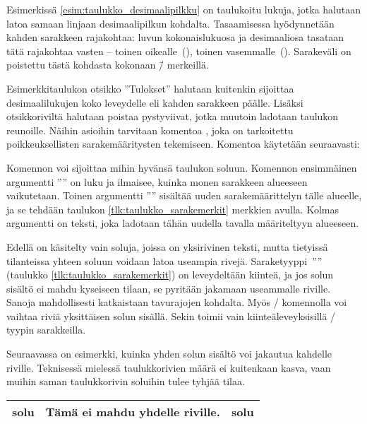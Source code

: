 Esimerkissä \ref{esim:taulukko_desimaalipilkku} on taulukoitu lukuja,
jotka halutaan latoa samaan linjaan desimaalipilkun kohdalta.
Tasaamisessa hyödynnetään kahden sarakkeen rajakohtaa: luvun
kokonaislukuosa ja desimaaliosa tasataan tätä rajakohtaa vasten --
toinen oikealle~(), toinen vasemmalle~(). Sarakeväli
on poistettu tästä kohdasta kokonaan \=/ merkeillä.

Esimerkkitaulukon otsikko ''Tulokset'' halutaan kuitenkin sijoittaa
desimaalilukujen koko leveydelle eli kahden sarakkeen päälle. Lisäksi
otsikkoriviltä halutaan poistaa pystyviivat, jotka muutoin ladotaan
taulukon reunoille. Näihin asioihin tarvitaan komentoa
, joka on tarkoitettu poikkeuksellisten
sarakemääritysten tekemiseen. Komentoa käytetään seuraavasti:

\begin{koodilohkosis}
\end{koodilohkosis}

Komennon  voi sijoittaa mihin hyvänsä taulukon
soluun. Komennon ensimmäinen argumentti '''' on luku ja
ilmaisee, kuinka monen sarakkeen alueeseen vaikutetaan. Toinen
argumentti '''' sisältää uuden sarakemäärittelyn
tälle alueelle, ja se tehdään taulukon \ref{tlk:taulukko_sarakemerkit}
merkkien avulla. Kolmas argumentti on teksti, joka ladotaan tähän
uudella tavalla määriteltyyn alueeseen.

Edellä on käsitelty vain soluja, joissa on yksirivinen teksti, mutta
tietyissä tilanteissa yhteen soluun voidaan latoa useampia rivejä.
Saraketyyppi~'''' (taulukko \ref{tlk:taulukko_sarakemerkit}) on
leveydeltään kiinteä, ja jos solun sisältö ei mahdu kyseiseen tilaan, se
pyritään jakamaan useammalle riville. Sanoja mahdollisesti katkaistaan
tavurajojen kohdalta. Myös \-/ komennolla voi vaihtaa
riviä yksittäisen solun sisällä. Sekin toimii vain kiinteäleveyksisillä
\-/ tyypin sarakkeilla.

Seuraavassa on esimerkki, kuinka yhden solun sisältö voi jakautua
kahdelle riville. Teknisessä mielessä taulukkorivien määrä ei kuitenkaan
kasva, vaan muihin saman taulukkorivin soluihin tulee tyhjää tilaa.

\komentoi{\keno}
\begin{koodilohkosis}
\begin{tabular}{|l|p{6.5em}|l|}
  \hline solu & Tämä ei mahdu yhdelle riville. & solu \\ \hline
\end{tabular}
\end{koodilohkosis}

